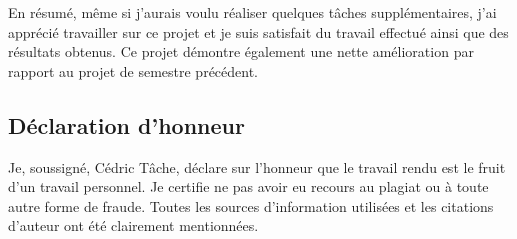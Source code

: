 En résumé, même si j'aurais voulu réaliser quelques tâches supplémentaires, j'ai apprécié travailler sur ce projet et je suis satisfait du travail effectué ainsi que des résultats obtenus. Ce projet démontre également une nette amélioration par rapport au projet de semestre précédent.

\subsection{Déclaration d'honneur}

Je, soussigné, Cédric Tâche, déclare sur l’honneur que le travail rendu est le fruit d’un travail personnel. Je certifie ne pas avoir eu recours au plagiat ou à toute autre forme de fraude. Toutes les sources d’information utilisées et les citations d’auteur ont été clairement mentionnées.